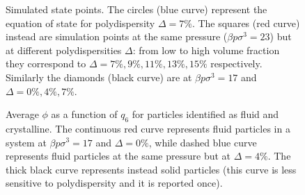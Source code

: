 \documentclass[twocolumn,superscriptaddress]{revtex4-1}
\begin{document}
\tikzset{external/force remake=false}
\begin{figure}
	\caption{Simulated state points. The circles (blue curve) represent the equation of state for polydispersity $\Delta=7\%$. The squares (red curve) instead are simulation points at the same pressure ($\beta p\sigma^3=23$) but at different polydispersities $\Delta$: from low to high volume fraction they correspond to $\Delta=7\%,9\%,11\%,13\%,15\%$ respectively. Similarly the diamonds (black curve) are at $\beta p\sigma^3=17$ and $\Delta=0\%,4\%,7\%$.}
	\label{fig:eos}
\end{figure}

\tikzset{external/force remake=false}
\begin{figure}
	 \caption{Average $\phi$ as a function of $q_6$ for particles identified as fluid and crystalline. The continuous red curve represents fluid particles in a system at $\beta p\sigma^3=17$ and $\Delta=0\%$, while dashed blue curve represents fluid particles at the same pressure but at $\Delta=4\%$. The thick black curve represents instead solid particles (this curve is less sensitive to polydispersity and it is reported once).}
 \label{fig:stability_map}
\end{figure}
\end{document}
